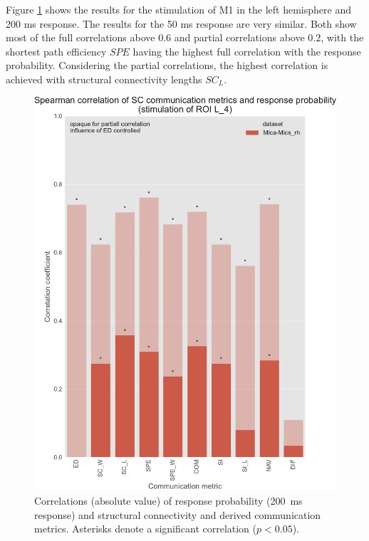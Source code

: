 Figure \ref{fig:ftract_mica_long_probabilities_L4} shows the results for the stimulation of M1 in the left hemisphere and 200 ms response. The results for the 50 ms response are very similar. Both show most of the full correlations above $0.6$ and partial correlations above $0.2$, with the shortest path efficiency $SPE$ having the highest full correlation with the response probability. Considering the partial correlations, the highest correlation is achieved with structural connectivity lengths $SC_L$.

\begin{figure}
    \centering
    \includegraphics[width=\textwidth]{images/nootebook_generated/ftract_results_per_roi/long/MNI-HCP-MMP1/ED0/0.25/Spearman_correlation_of_SC_communication_metrics_and_response_probability_(stimulation_of_ROI_L_4).pdf}
    \caption[F-Tract probability correlations - Mica-Mics\_rh L\_4]{Correlations (absolute value) of response probability (200~ms response) and structural connectivity and derived communication metrics. Asterisks denote a significant correlation ($p<0.05$).}
    \label{fig:ftract_mica_long_probabilities_L4}
\end{figure}

